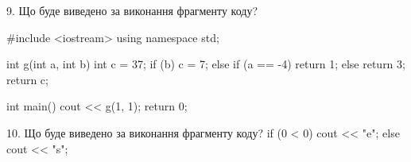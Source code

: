 \documentclass[11pt, ukrainian]{article}
\begin{document}
\begin{large}

9. Що буде виведено за виконання фрагменту коду?

#include <iostream>
using namespace std;

int g(int a, int b){
    int c = 37;
    if (b)
        c = 7;
    else if (a == -4)
         return 1;
    else 
        return 3;
    return c;
}

int main(){
    cout << g(1, 1);
    return 0;
}


10. Що буде виведено за виконання фрагменту коду?
if (0 < 0)
    cout << "e";
else
    cout << "s";


\end{large}
\vspace{20mm}
\end{document}

